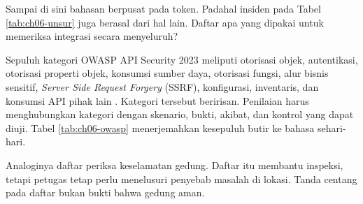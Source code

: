 Sampai di sini bahasan berpusat pada token. Padahal insiden pada Tabel \ref{tab:ch06-unsur} juga berasal dari hal lain.
Daftar apa yang dipakai untuk memeriksa integrasi secara menyeluruh?

Sepuluh kategori OWASP API Security 2023 meliputi otorisasi objek, autentikasi, otorisasi properti objek, konsumsi sumber
daya, otorisasi fungsi, alur bisnis sensitif, \textit{Server Side Request Forgery} (SSRF), konfigurasi, inventaris, dan
konsumsi API pihak lain \cite{owasp-api2023}. Kategori tersebut beririsan. Penilaian harus menghubungkan kategori dengan
skenario, bukti, akibat, dan kontrol yang dapat diuji. Tabel \ref{tab:ch06-owasp} menerjemahkan kesepuluh butir ke bahasa
sehari-hari.

Analoginya daftar periksa keselamatan gedung. Daftar itu membantu inspeksi, tetapi petugas tetap perlu menelusuri
penyebab masalah di lokasi. Tanda centang pada daftar bukan bukti bahwa gedung aman.


